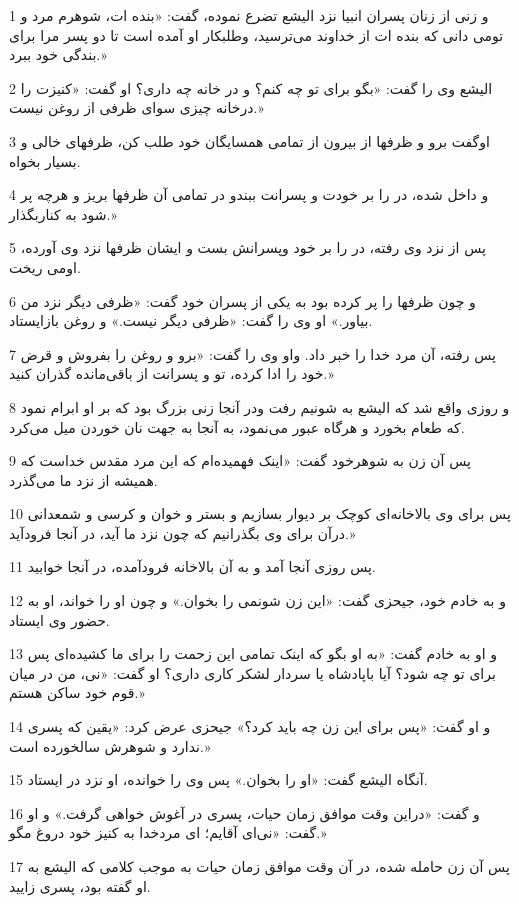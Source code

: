 \par 1 و زنی از زنان پسران انبیا نزد الیشع تضرع نموده، گفت: «بنده ات، شوهرم مرد و تومی دانی که بنده ات از خداوند می‌ترسید، وطلبکار او آمده است تا دو پسر مرا برای بندگی خود ببرد.»
\par 2 الیشع وی را گفت: «بگو برای تو چه کنم؟ و در خانه چه داری؟ او گفت: «کنیزت را درخانه چیزی سوای ظرفی از روغن نیست.»
\par 3 اوگفت برو و ظرفها از بیرون از تمامی همسایگان خود طلب کن، ظرفهای خالی و بسیار بخواه.
\par 4 و داخل شده، در را بر خودت و پسرانت ببندو در تمامی آن ظرفها بریز و هرچه پر شود به کناربگذار.»
\par 5 پس از نزد وی رفته، در را بر خود وپسرانش بست و ایشان ظرفها نزد وی آورده، اومی ریخت.
\par 6 و چون ظرفها را پر کرده بود به یکی از پسران خود گفت: «ظرفی دیگر نزد من بیاور.» او وی را گفت: «ظرفی دیگر نیست.» و روغن بازایستاد.
\par 7 پس رفته، آن مرد خدا را خبر داد. واو وی را گفت: «برو و روغن را بفروش و قرض خود را ادا کرده، تو و پسرانت از باقی‌مانده گذران کنید.»
\par 8 و روزی واقع شد که الیشع به شونیم رفت ودر آنجا زنی بزرگ بود که بر او ابرام نمود که طعام بخورد و هرگاه عبور می‌نمود، به آنجا به جهت نان خوردن میل می‌کرد.
\par 9 پس آن زن به شوهرخود گفت: «اینک فهمیده‌ام که این مرد مقدس خداست که همیشه از نزد ما می‌گذرد.
\par 10 پس برای وی بالاخانه‌ای کوچک بر دیوار بسازیم و بستر و خوان و کرسی و شمعدانی درآن برای وی بگذرانیم که چون نزد ما آید، در آنجا فرودآید.»
\par 11 پس روزی آنجا آمد و به آن بالاخانه فرودآمده، در آنجا خوابید.
\par 12 و به خادم خود، جیحزی گفت: «این زن شونمی را بخوان.» و چون او را خواند، او به حضور وی ایستاد.
\par 13 و او به خادم گفت: «به او بگو که اینک تمامی این زحمت را برای ما کشیده‌ای پس برای تو چه شود؟ آیا باپادشاه یا سردار لشکر کاری داری؟ او گفت: «نی، من در میان قوم خود ساکن هستم.»
\par 14 و او گفت: «پس برای این زن چه باید کرد؟» جیحزی عرض کرد: «یقین که پسری ندارد و شوهرش سالخورده است.»
\par 15 آنگاه الیشع گفت: «او را بخوان.» پس وی را خوانده، او نزد در ایستاد.
\par 16 و گفت: «دراین وقت موافق زمان حیات، پسری در آغوش خواهی گرفت.» و او گفت: «نی‌ای آقایم؛ ای مردخدا به کنیز خود دروغ مگو.»
\par 17 پس آن زن حامله شده، در آن وقت موافق زمان حیات به موجب کلامی که الیشع به او گفته بود، پسری زایید.
